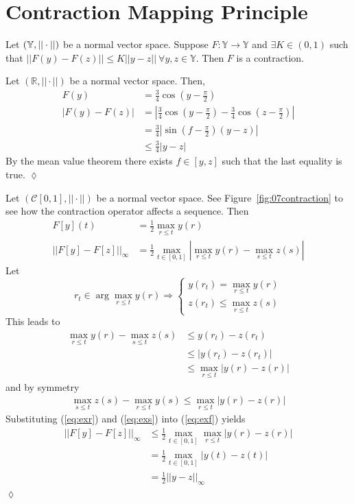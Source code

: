\section{Contraction Mapping Principle}
\begin{definition}
Let $(\mathbb{Y},||\cdot||)$ be a normal vector space.
Suppose $F:\mathbb{Y}\to\mathbb{Y}$ and $\exists K\in(0,1)$ such that $||F(y)-F(z)||\leq K||y-z||~\forall y,z\in\mathbb{Y}$.
Then $F$ is a contraction.
\end{definition}

\begin{example}
Let $(\mathbb{R},||\cdot||)$ be a normal vector space.
Then,
\begin{align*}
F(y) &= \frac{3}{4}\cos(y-\frac{\pi}{2}) \\
|F(y)-F(z)| &= \left|\frac{3}{4}\cos(y-\frac{\pi}{2})-\frac{3}{4}\cos(z-\frac{\pi}{2})\right| \\
&= \frac{3}{4}\left|\sin(f-\frac{\pi}{2})(y-z)\right| \\
&\leq \frac{3}{4}|y-z|
\end{align*}
By the mean value theorem there exists $f\in[y,z]$ such that the last equality is true.
$\lozenge$
\end{example}

\begin{example}
Let $(\mathcal{C}[0,1],||\cdot||)$ be a normal vector space.
See Figure~\ref{fig:07contraction} to see how the contraction operator affects a sequence.
Then
\begin{align}
\label{eq:exf}
F[y](t) &= \frac{1}{2}\max_{r\leq t}y(r) \nonumber \\
||F[y]-F[z]||_\infty &= \frac{1}{2}\max_{t\in[0,1]}|\max_{r\leq t}y(r)-\max_{s\leq t}z(s)|
\end{align}
Let
$$r_t\in\arg\max_{r\leq t}y(r) \Rightarrow \begin{cases} y(r_t) = \max_{r\leq t}y(r) \\ z(r_t)\leq\max_{r\leq t}z(s) \end{cases}$$
This leads to
\begin{align}
\label{eq:exr}
\max_{r\leq t}y(r)-\max_{s\leq t}z(s) &\leq y(r_t)-z(r_t) \nonumber \\
&\leq |y(r_t)-z(r_t)| \nonumber \\
&\leq \max_{r\leq t}|y(r)-z(r)|
\end{align}
and by symmetry
\begin{align}
\label{eq:exs}
\max_{s\leq t}z(s)-\max_{r\leq t}y(s) \leq \max_{r\leq t}|y(r)-z(r)|
\end{align}
Substituting (\ref{eq:exr}) and (\ref{eq:exs}) into (\ref{eq:exf}) yields
\begin{align*}
||F[y]-F[z]||_\infty &\leq \frac{1}{2}\max_{t\in[0,1]}\max_{r\leq t}|y(r)-z(r)| \\
&= \frac{1}{2}\max_{t\in[0,1]}|y(t)-z(t)| \\
&= \frac{1}{2}||y-z||_\infty
\end{align*}
$\lozenge$
\end{example}

